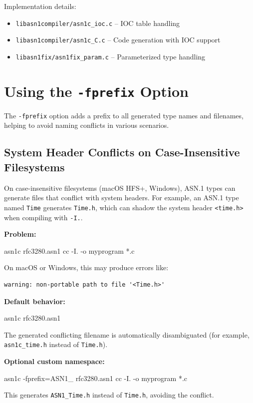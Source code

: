 \documentclass[english,oneside,12pt]{book}
\begin{document}
Implementation details:
\begin{itemize}
\item \texttt{libasn1compiler/asn1c\_ioc.c} -- IOC table handling
\item \texttt{libasn1compiler/asn1c\_C.c} -- Code generation with IOC support
\item \texttt{libasn1fix/asn1fix\_param.c} -- Parameterized type handling
\end{itemize}

\section{\label{sec:Using-fprefix}Using the \texttt{-fprefix} Option}

The \texttt{-fprefix} option adds a prefix to all generated type names and filenames, 
helping to avoid naming conflicts in various scenarios.

\subsection*{System Header Conflicts on Case-Insensitive Filesystems}

On case-insensitive filesystems (macOS HFS+, Windows), ASN.1 types can generate 
files that conflict with system headers. For example, an ASN.1 type named \texttt{Time} 
generates \texttt{Time.h}, which can shadow the system header \texttt{<time.h>} when 
compiling with \texttt{-I.}.

\textbf{Problem:}
\begin{bash}
asn1c rfc3280.asn1
cc -I. -o myprogram *.c
\end{bash}

On macOS or Windows, this may produce errors like:
\begin{verbatim}
warning: non-portable path to file '<Time.h>'
\end{verbatim}

\textbf{Default behavior:}
\begin{bash}
asn1c rfc3280.asn1
\end{bash}
The generated conflicting filename is automatically disambiguated (for example,
\texttt{asn1c\_time.h} instead of \texttt{Time.h}).

\textbf{Optional custom namespace:}
\begin{bash}
asn1c -fprefix=ASN1_ rfc3280.asn1
cc -I. -o myprogram *.c
\end{bash}

This generates \texttt{ASN1\_Time.h} instead of \texttt{Time.h}, avoiding the conflict.
\end{document}
